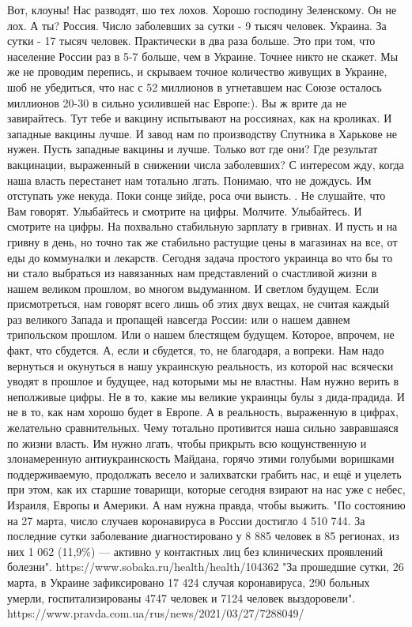 Вот, клоуны!
Нас разводят, шо тех лохов.
Хорошо господину Зеленскому. Он не лох.
А ты?
Россия. Число заболевших за сутки - 9 тысяч человек.
Украина. За сутки - 17 тысяч человек.
Практически в два раза больше. Это при том, что население России раз в 5-7 больше, чем в Украине.
Точнее никто не скажет. Мы же не проводим перепись, и скрываем точное количество живущих в Украине, шоб не убедиться, что нас с 52 миллионов в угнетавшем нас Союзе осталось миллионов 20-30 в сильно усилившей нас Европе:).
Вы ж врите да не завирайтесь. Тут тебе и вакцину испытывают на россиянах, как на кроликах. И западные вакцины лучше. И завод нам по производству Спутника в Харькове не нужен.
Пусть западные вакцины и лучше. Только вот где они? Где результат вакцинации, выраженный в снижении числа заболевших?
С интересом жду, когда наша власть перестанет нам тотально лгать. Понимаю, что не дождусь. Им отступать уже некуда. Поки сонце зийде, роса очи выисть.🙂.
Не слушайте, что Вам говорят. Улыбайтесь и смотрите на цифры.
Молчите. Улыбайтесь. И смотрите на цифры.
На похвально стабильную зарплату в гривнах. И пусть и на гривну в день, но точно так же стабильно растущие цены в магазинах на все, от еды до коммуналки и лекарств.
Сегодня задача простого украинца во что бы то ни стало выбраться из навязанных нам представлений о счастливой жизни в нашем великом прошлом, во многом выдуманном. И светлом будущем.
Если присмотреться, нам говорят всего лишь об этих двух вещах, не считая каждый раз великого Запада и пропащей навсегда России: или о нашем давнем трипольском прошлом. Или о нашем блестящем будущем. Которое, впрочем, не факт, что сбудется.
А, если и сбудется, то, не благодаря, а вопреки.
Нам надо вернуться и окунуться в нашу украинскую реальность, из которой нас всячески уводят в прошлое и будущее, над которыми мы не властны.
Нам нужно верить в неполживые цифры.
Не в то, какие мы великие украинцы булы з дида-прадида.
И не в то, как нам хорошо будет в Европе. А в реальность, выраженную в цифрах, желательно сравнительных. Чему тотально противится наша сильно завравшаяся по жизни власть.
Им нужно лгать, чтобы прикрыть всю кощунственную и злонамеренную антиукраинскость Майдана, горячо этими голубыми воришками поддерживаемую, продолжать весело и залихватски грабить нас, и ещё и уцелеть при этом, как их старшие товарищи, которые сегодня взирают на нас уже с небес, Израиля, Европы и Америки. А нам нужна правда, чтобы выжить.
"По состоянию на 27 марта, число случаев коронавируса в России достигло 4 510 744. За последние сутки заболевание диагностировано у 8 885 человек в 85 регионах, из них 1 062 (11,9\%) — активно у контактных лиц без клинических проявлений болезни".
https://www.sobaka.ru/health/health/104362
"За прошедшие сутки, 26 марта, в Украине зафиксировано 17 424 случая коронавируса, 290 больных умерли, госпитализированы 4747 человек и 7124 человек выздоровели".
https://www.pravda.com.ua/rus/news/2021/03/27/7288049/




